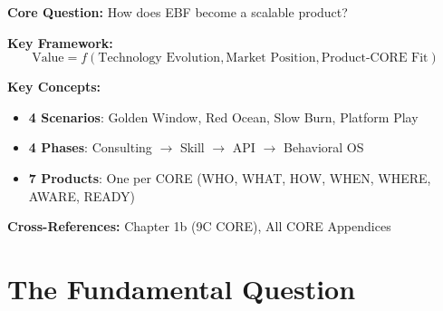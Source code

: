 
\begin{abstract}
This appendix addresses the fundamental strategic question: \textbf{How does EBF transition from consulting methodology to scalable AI-embedded products?} We develop a technological roadmap with four distinct scenarios, analyze EBF's strategic positioning in each, define the product options matrix mapping 9C COREs to revenue models, and chart the productizing journey from today's consulting practice to tomorrow's Behavioral AI platform.
\end{abstract}


\begin{tcolorbox}[colback=blue!5!white, colframe=blue!75!black,
    title=Quick Reference: Appendix VVV]

\textbf{Core Question:} How does EBF become a scalable product?

\textbf{Key Framework:}
\begin{equation}
\text{Value} = f(\text{Technology Evolution}, \text{Market Position}, \text{Product-CORE Fit})
\end{equation}

\textbf{Key Concepts:}
\begin{itemize}[nosep]
\item \textbf{4 Scenarios}: Golden Window, Red Ocean, Slow Burn, Platform Play
\item \textbf{4 Phases}: Consulting $\to$ Skill $\to$ API $\to$ Behavioral OS
\item \textbf{7 Products}: One per CORE (WHO, WHAT, HOW, WHEN, WHERE, AWARE, READY)
\end{itemize}

\textbf{Cross-References:} Chapter 1b (9C CORE), All CORE Appendices
\end{tcolorbox}


\section{The Fundamental Question}
\label{sec:vvv-fundamental}

